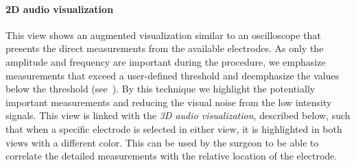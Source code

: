 \paragraph{2D audio visualization} This view shows an augmented visualization similar to an oscilloscope that presents the direct measurements from the available electrodes. As only the amplitude and frequency are important during the procedure, we emphasize measurements that exceed a user-defined threshold and deemphasize the values below the threshold (see~). By this technique we highlight the potentially important measurements and reducing the visual noise from the low intensity signals. This view is linked with the \emph{3D audio visualization}, described below, such that when a specific electrode is selected in either view, it is highlighted in both views with a different color. This can be used by the surgeon to be able to correlate the detailed measurements with the relative location of the electrode.
